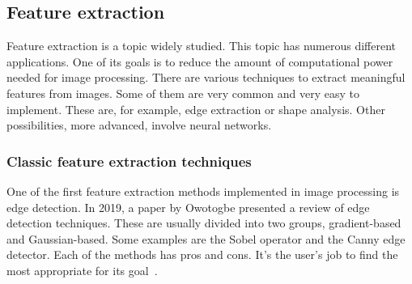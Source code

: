 \documentclass[conference]{IEEEtran}
\begin{document}
		\subsection{Feature extraction}

			Feature extraction is a topic widely studied. 
			This topic has numerous different applications. 
			One of its goals is to reduce the amount of computational power needed for image processing. 
			There are various techniques to extract meaningful features from images. 
			Some of them are very common and very easy to implement. 
			These are, for example, edge extraction or shape analysis. 
			Other possibilities, more advanced, involve neural networks.\\

				\subsubsection{Classic feature extraction techniques}
					
					One of the first feature extraction methods implemented in image processing is edge detection.				
					In 2019, a paper by Owotogbe presented a review of edge detection techniques. 
					These are usually divided into two groups, gradient-based and Gaussian-based. 
					Some examples are the Sobel operator and the Canny edge detector. 
					Each of the methods has pros and cons. 
					It's the user's job to find the most appropriate for its goal~\cite{owotogbe2019edge}.\\
					
\end{document}
